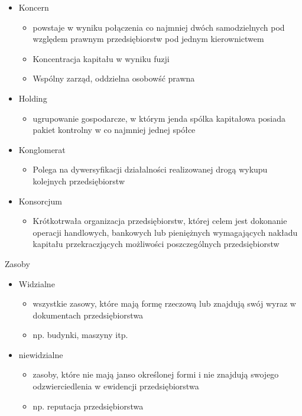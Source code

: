 \documentclass[a4paper,10pt]{report}
\begin{document}
\begin{itemize}
\begin{itemize}
	\end{itemize}
	\item Koncern
	\begin{itemize}
		\item powstaje w wyniku połączenia co najmniej dwóch samodzielnych pod względem prawnym przedsiębiorstw pod jednym kierownictwem
		\item Koncentracja kapitału w wyniku fuzji
		\item Wspólny zarząd, oddzielna osobowść prawna
	\end{itemize}
	\item Holding
	\begin{itemize}
		\item ugrupowanie gospodarcze, w którym jenda spólka kapitałowa posiada pakiet kontrolny w co najmniej jednej spółce
	\end{itemize}
	\item Konglomerat
	\begin{itemize}
		\item Polega na dywersyfikacji działalności realizowanej drogą wykupu kolejnych przedsiębiorstw
	\end{itemize}
	\item Konsorcjum
	\begin{itemize}
		\item Krótkotrwała organizacja przedsiębiorstw, której celem jest dokonanie operacji handlowych, bankowych lub pieniężnych wymagających nakładu kapitału przekraczjących możliwości poszczególnych przedsiębiorstw
	\end{itemize}
\end{itemize}

\noindent Zasoby
\begin{itemize}
	\item Widzialne
	\begin{itemize}
		\item wszystkie zasowy, które mają formę rzeczową lub znajdują swój wyraz w dokumentach przedsiębiorstwa
		\item np. budynki, maszyny itp.
	\end{itemize}
	\item niewidzialne
	\begin{itemize}
		\item zasoby, które nie mają janso określonej formi i nie znajdują swojego odzwierciedlenia w ewidencji przedsiębiorstwa
		\item np. reputacja przedsiębiorstwa
	\end{itemize}
\end{itemize}
\end{document}
